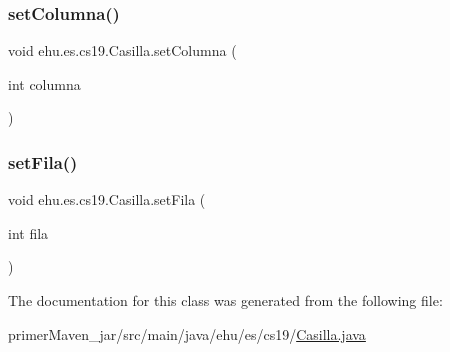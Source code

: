 \mbox{\label{classehu_1_1es_1_1cs19_1_1_casilla_a6fd764d3538340e21c46b0e0c49cfc7b}} 
\subsubsection{\texorpdfstring{setColumna()}{setColumna()}}
{\footnotesize\ttfamily void ehu.\+es.\+cs19.\+Casilla.\+set\+Columna (\begin{DoxyParamCaption}\item[{int}]{columna }\end{DoxyParamCaption})}

\mbox{\label{classehu_1_1es_1_1cs19_1_1_casilla_ad7bc4a453c5edfef3c7c227c50eb433e}} 
\subsubsection{\texorpdfstring{setFila()}{setFila()}}
{\footnotesize\ttfamily void ehu.\+es.\+cs19.\+Casilla.\+set\+Fila (\begin{DoxyParamCaption}\item[{int}]{fila }\end{DoxyParamCaption})}



The documentation for this class was generated from the following file\+:\begin{DoxyCompactItemize}
\item 
primer\+Maven\+\_\+jar/src/main/java/ehu/es/cs19/\mbox{\hyperlink{_casilla_8java}{Casilla.\+java}}\end{DoxyCompactItemize}
